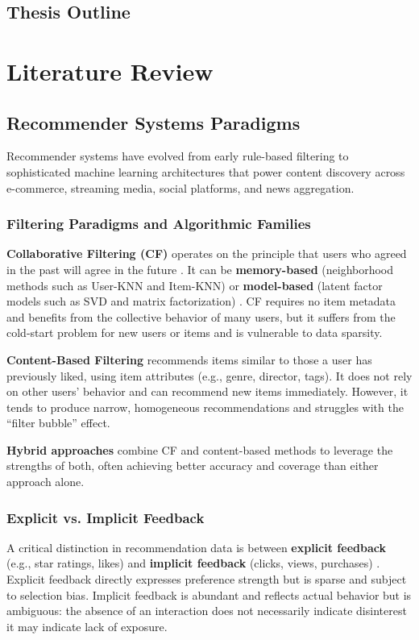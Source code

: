 \documentclass[11pt,a4paper]{report}
\begin{document}
\section{Thesis Outline}

\chapter{Literature Review}
\label{ch:lit_review}

\section{Recommender Systems Paradigms}
Recommender systems have evolved from early rule-based filtering to sophisticated machine learning architectures that power content discovery across e-commerce, streaming media, social platforms, and news aggregation.

\subsection{Filtering Paradigms and Algorithmic Families}
\textbf{Collaborative Filtering (CF)} operates on the principle that users who agreed in the past will agree in the future \citep{sarwar2001item}. It can be \textbf{memory-based} (neighborhood methods such as User-KNN and Item-KNN) or \textbf{model-based} (latent factor models such as SVD and matrix factorization) \citep{koren2009matrix}. CF requires no item metadata and benefits from the collective behavior of many users, but it suffers from the cold-start problem for new users or items and is vulnerable to data sparsity.

\textbf{Content-Based Filtering} recommends items similar to those a user has previously liked, using item attributes (e.g., genre, director, tags). It does not rely on other users' behavior and can recommend new items immediately. However, it tends to produce narrow, homogeneous recommendations and struggles with the ``filter bubble'' effect.

\textbf{Hybrid approaches} combine CF and content-based methods to leverage the strengths of both, often achieving better accuracy and coverage than either approach alone.

\subsection{Explicit vs. Implicit Feedback}
A critical distinction in recommendation data is between \textbf{explicit feedback} (e.g., star ratings, likes) and \textbf{implicit feedback} (clicks, views, purchases) \citep{hu2008collaborative}. Explicit feedback directly expresses preference strength but is sparse and subject to selection bias. Implicit feedback is abundant and reflects actual behavior but is ambiguous: the absence of an interaction does not necessarily indicate disinterest it may indicate lack of exposure.
\end{document}
